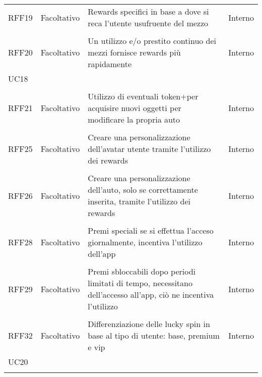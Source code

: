 \begin{longtable}{ >{\centering}p{} >{\centering}p{}
		>{\raggedright}p{} >{\centering}p{}}
	RFF19	&	Facoltativo	& Rewards specifici in base a dove si reca l'utente usufruente del mezzo &	Interno  \\ 	\tabularnewline
	RFF20	&	Facoltativo	& Un utilizzo e/o prestito continuo dei mezzi fornisce rewards più rapidamente &	Interno\\UC18  \\ 	\tabularnewline
	RFF21	&	Facoltativo	& Utilizzo di eventuali token+\glosp per acquisire nuovi oggetti per modificare la propria auto  &	Interno  \\ 	\tabularnewline
	RFF25	&	Facoltativo	& Creare una personalizzazione dell'avatar utente tramite l'utilizzo dei rewards  &	Interno  \\ 	\tabularnewline
	RFF26	&	Facoltativo	& Creare una personalizzazione dell'auto, solo se correttamente inserita, tramite l'utilizzo dei rewards  &	Interno  \\ 	\tabularnewline
	RFF28	&	Facoltativo	& Premi speciali se si effettua l'acceso giornalmente, incentiva l'utilizzo dell'app  &	Interno  \\ 	\tabularnewline
	RFF29	&	Facoltativo	& Premi sbloccabili dopo periodi limitati di tempo, necessitano dell'accesso all'app, ciò ne incentiva l'utilizzo  &	Interno  \\ 	\tabularnewline
	RFF32	&	Facoltativo	& Differenziazione delle lucky spin in base al tipo di utente: base, premium e vip &	Interno\\UC20  \\ 	\tabularnewline

\end{longtable}
